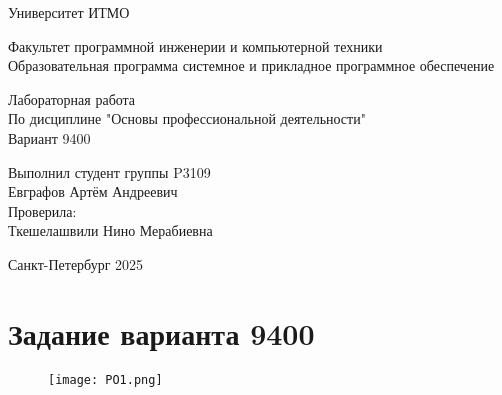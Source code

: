 

\thispagestyle{empty}
\begin{center}
\LARGE{Университет ИТМО} 
\vspace{20pt}

\LARGE{Факультет программной инженерии и компьютерной техники \\
Образовательная программа системное и прикладное программное обеспечение}
\vspace{160pt}

\LARGE{Лабораторная работа   \\
По дисциплине "Основы профессиональной деятельности" \\ 
Вариант 9400}
\vspace{120pt}
\end{center}

\begin{flushright}
\LARGE{Выполнил студент группы P3109 \\ 
Евграфов Артём Андреевич \\
Проверила: \\
Ткешелашвили Нино Мерабиевна}
\vspace{120pt}
\end{flushright}

\begin{center}
\Large{Санкт-Петербург 2025}
\end{center}

\newpage
\setcounter{page}{1}
\tableofcontents
\newpage
\section{Задание варианта 9400}
\begin{figure}[H]
    \centering
    \texttt{[image: PO1.png]}
\end{figure}
